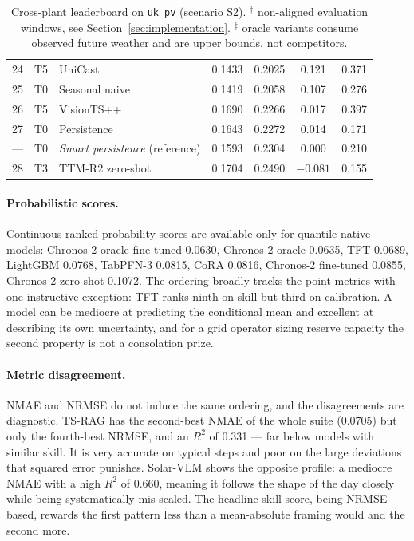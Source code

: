 \begin{table}[h!]
\begin{tabular}{r l l c c c c}
24 & T5 & UniCast & 0.1433 & 0.2025 & 0.121 & 0.371 \\
25 & T0 & Seasonal naive & 0.1419 & 0.2058 & 0.107 & 0.276 \\
26 & T5 & VisionTS++ & 0.1690 & 0.2266 & 0.017 & 0.397 \\
27 & T0 & Persistence & 0.1643 & 0.2272 & 0.014 & 0.171 \\
--- & T0 & \emph{Smart persistence} (reference) & 0.1593 & 0.2304 & 0.000 & 0.210 \\
28 & T3 & TTM-R2 zero-shot & 0.1704 & 0.2490 & $-0.081$ & 0.155 \\
\hline
\end{tabular}
\caption{Cross-plant leaderboard on \texttt{uk\_pv} (scenario S2). $^{\dagger}$ non-aligned
evaluation windows, see Section~\ref{sec:implementation}. $^{\ddagger}$ oracle variants
consume observed future weather and are upper bounds, not competitors.}
\label{tab:leaderboard}
\end{table}

\paragraph{Probabilistic scores.} Continuous ranked probability scores are available only
for quantile-native models: Chronos-2 oracle fine-tuned 0.0630, Chronos-2 oracle 0.0635,
TFT 0.0689, LightGBM 0.0768, TabPFN-3 0.0815, CoRA 0.0816, Chronos-2 fine-tuned 0.0855,
Chronos-2 zero-shot 0.1072. The ordering broadly tracks the point metrics with one
instructive exception: TFT ranks ninth on skill but third on calibration. A model can be
mediocre at predicting the conditional mean and excellent at describing its own uncertainty,
and for a grid operator sizing reserve capacity the second property is not a consolation
prize.

\paragraph{Metric disagreement.} NMAE and NRMSE do not induce the same ordering, and the
disagreements are diagnostic. TS-RAG has the second-best NMAE of the whole suite (0.0705)
but only the fourth-best NRMSE, and an $R^2$ of 0.331 --- far below models with similar
skill. It is very accurate on typical steps and poor on the large deviations that squared
error punishes. Solar-VLM shows the opposite profile: a mediocre NMAE with a high $R^2$ of
0.660, meaning it follows the shape of the day closely while being systematically
mis-scaled. The headline skill score, being NRMSE-based, rewards the first pattern less
than a mean-absolute framing would and the second more.

